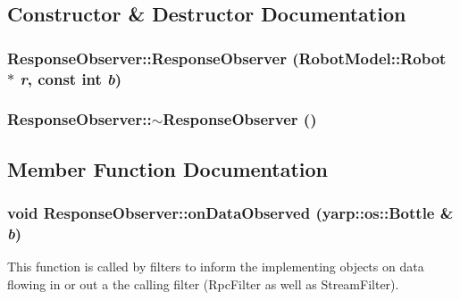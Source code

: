 \subsection{Constructor \& Destructor Documentation}
\hypertarget{class_response_observer_ac958ccf1a3b7667ef26449a998e5b5be}{
\subsubsection[{ResponseObserver}]{\setlength{\rightskip}{0pt plus 5cm}ResponseObserver::ResponseObserver ({\bf RobotModel::Robot} $\ast$ {\em r}, \/  const int {\em b})}}
\label{class_response_observer_ac958ccf1a3b7667ef26449a998e5b5be}
\hypertarget{class_response_observer_aabadfb48e9895cec34fe2b54e157739b}{
\subsubsection[{$\sim$ResponseObserver}]{\setlength{\rightskip}{0pt plus 5cm}ResponseObserver::$\sim$ResponseObserver ()}}
\label{class_response_observer_aabadfb48e9895cec34fe2b54e157739b}


\subsection{Member Function Documentation}
\hypertarget{class_response_observer_a2d847c448b31b5aa880b9282f7bf223d}{
\subsubsection[{onDataObserved}]{\setlength{\rightskip}{0pt plus 5cm}void ResponseObserver::onDataObserved (yarp::os::Bottle \& {\em b})}}
\label{class_response_observer_a2d847c448b31b5aa880b9282f7bf223d}
This function is called by filters to inform the implementing objects on data flowing in or out a the calling filter (RpcFilter as well as StreamFilter). 

